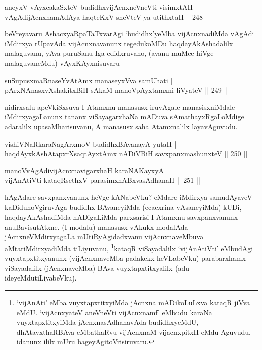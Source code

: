 
\begin{shl}
aneyxV vAyxcakaSxteV budidhxvijAcnxneVneVti visimxtAH |\\
vAgAdijAcnxnamAdAya haqteKxV sheVteV ya utithxtaH \hfill || 248 ||
\end{shl}

\begin{artha}
beVreyavaru AshacxyaRpaTaTxvarAgi `budidhx'yeMba vijAcnxnadiMda vAgAdi iMdirxya rUpavAda vijAcnxnavanunx tegedukoMDu haqdayAkAshadalilx malaguvanu, yAva puruSanu Iga edidxruvano, (avanu muMce hiVge malaguvaneMdu) vAyxKAyxnisuvaru |
\end{artha}


\begin{shl}
suSupusxmaRnaseYvA\s \s tAmx manaseyxVva samUhati |\\
pArxNAnasxvXshakitxBiH sAkaM manoV\s pAyxtamxni liVyateV \hfill || 249 ||
\end{shl}

\begin{artha}
nidirxsalu apeVkiSxsuva I Atamxnu manasusx iruvAgale manasisxniMdale  iMdirxyagaLanunx tananx viSayagarxhaNa mADuva sAmathayxRgaLoMdige adaralilx upasaMharisuvanu, A manasusx saha Atamxnalilx layavAguvudu.
\end{artha}

\begin{shl}
vishiVNaRkaraNagArxmoV budidhxBAvanayA yutaH |\\
haqdAyxkAshAtapxrXsaqtAyxtAmx nADiVBiH savxpanxmashunxteV \hfill || 250 ||
\end{shl}
\begin{shl}
manoVvAgAdivijAcnxnavigarxhaH karaNAKayxyA |\\
vijAnAtiVti kataqRsethxV parasimxnABxvasAdhanaH \hfill || 251 ||
\end{shl}

\begin{artha}
hAgAdare savxpanxvanunx heVge kANabeVku? eMdare  \mdash  iMdirxya samudAyaveV kaDiduhoVgiruvAga budidhx BAvaneyiMda (ecacxrina vAsaneyiMda) kUDi, haqdayAkAshadiMda nADigaLiMda parxsarisi I Atamxnu savxpanxvanunx anuBavisutAtxne. (I modalu) manasusx vAkukx modalAda jAcnxneVMdirxyagaLa mUtiRyAgidadxvanu vijAcnxnaveMbuva aMtariMdirxyadiMda tiLiyuvanu, \footnote{`vijAnAti' eMba vuyxtapxtitxyiMda jAcnxna mADikoLuLxva kataqR jiVva eMdU. `vijAcnxyateV aneVneVti vijAcnxnamf' eMbudu karaNa vuyxtapxtitxyiMda jAcnxnasAdhanavAda budidhxyeMdU, dhAtavxthaRBAva eMbathaRvu vijAcnxnaM vijacnxpitxH eMdu Aguvudu, idanunx ililx mUru bageyAgi\break toVrisiruvaru.}kataqR viSayadalilx `vijAnAtiVti' eMbudAgi vuyxtapxtitxyanunx (vijAcnxnaveMba padakekx heVLabeVku) parabarxhamx viSayadalilx (jAcnxnaveMba) BAva vuyxtapxtitxyalilx (adu ideyeMdu\break tiLiyabeVku).
\end{artha}

